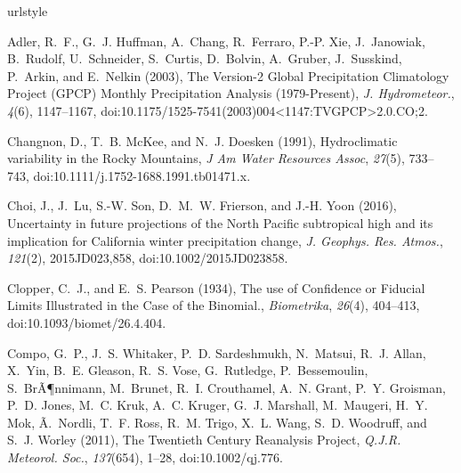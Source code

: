 \documentclass[final, double]{ua-thesis}
\begin{document}
\begin{thebibliography}{}
\providecommand{\natexlab}[1]{#1}
\expandafter\ifx\csname urlstyle\endcsname\relax
  \providecommand{\doi}[1]{doi:\discretionary{}{}{}#1}\else
  \providecommand{\doi}{doi:\discretionary{}{}{}\begingroup
  \urlstyle{rm}\Url}\fi

Adler, R.~F., G.~J. Huffman, A.~Chang, R.~Ferraro, P.-P. Xie, J.~Janowiak,
  B.~Rudolf, U.~Schneider, S.~Curtis, D.~Bolvin, A.~Gruber, J.~Susskind,
  P.~Arkin, and E.~Nelkin (2003), The {Version}-2 {Global} {Precipitation}
  {Climatology} {Project} ({GPCP}) {Monthly} {Precipitation} {Analysis}
  (1979-{Present}), \textit{J. Hydrometeor.}, \textit{4}(6), 1147--1167,
  \doi{10.1175/1525-7541(2003)004<1147:TVGPCP>2.0.CO;2}.

Changnon, D., T.~B. McKee, and N.~J. Doesken (1991), Hydroclimatic variability
  in the {Rocky} {Mountains}, \textit{J Am Water Resources Assoc},
  \textit{27}(5), 733--743, \doi{10.1111/j.1752-1688.1991.tb01471.x}.

Choi, J., J.~Lu, S.-W. Son, D.~M.~W. Frierson, and J.-H. Yoon (2016),
  Uncertainty in future projections of the {North} {Pacific} subtropical high
  and its implication for {California} winter precipitation change, \textit{J.
  Geophys. Res. Atmos.}, \textit{121}(2), 2015JD023,858,
  \doi{10.1002/2015JD023858}.

Clopper, C.~J., and E.~S. Pearson (1934), The use of {Confidence} or {Fiducial}
  {Limits} {Illustrated} in the {Case} of the {Binomial}., \textit{Biometrika},
  \textit{26}(4), 404--413, \doi{10.1093/biomet/26.4.404}.

Compo, G.~P., J.~S. Whitaker, P.~D. Sardeshmukh, N.~Matsui, R.~J. Allan,
  X.~Yin, B.~E. Gleason, R.~S. Vose, G.~Rutledge, P.~Bessemoulin,
  S.~BrÃ¶nnimann, M.~Brunet, R.~I. Crouthamel, A.~N. Grant, P.~Y. Groisman,
  P.~D. Jones, M.~C. Kruk, A.~C. Kruger, G.~J. Marshall, M.~Maugeri, H.~Y. Mok,
  Ã.~Nordli, T.~F. Ross, R.~M. Trigo, X.~L. Wang, S.~D. Woodruff, and S.~J.
  Worley (2011), The {Twentieth} {Century} {Reanalysis} {Project},
  \textit{Q.J.R. Meteorol. Soc.}, \textit{137}(654), 1--28,
  \doi{10.1002/qj.776}.


\end{thebibliography}
\end{document}
